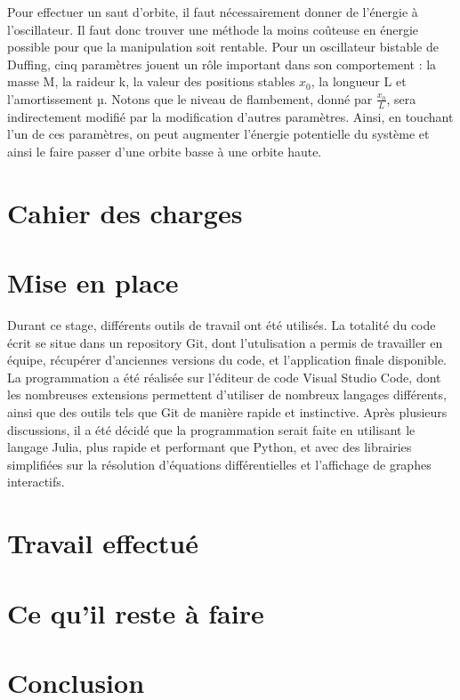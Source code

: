 \documentclass[a4paper, french, 12pt, titlepage]{report}
\begin{document}
Pour effectuer un saut d'orbite, il faut nécessairement donner de l'énergie à l'oscillateur. Il faut donc trouver une méthode la moins coûteuse en énergie possible pour que la manipulation soit rentable. Pour un oscillateur bistable de Duffing, cinq paramètres jouent un rôle important dans son comportement : la masse M, la raideur k, la valeur des positions stables $x_0$, la longueur L et l'amortissement µ. Notons que le niveau de flambement, donné par $\frac{x_0}{L}$, sera indirectement modifié par la modification d'autres paramètres. Ainsi, en touchant l'un de ces paramètres, on peut augmenter l'énergie potentielle du système et ainsi le faire passer d'une orbite basse à une orbite haute. 


\section{Cahier des charges}

\section{Mise en place}

Durant ce stage, différents outils de travail ont été utilisés. La totalité du code écrit se situe dans un repository Git, dont l'utulisation a permis de travailler en équipe, récupérer d'anciennes versions du code, et l'application finale disponible. La programmation a été réalisée sur l'éditeur de code Visual Studio Code, dont les nombreuses extensions permettent d'utiliser de nombreux langages différents, ainsi que des outils tels que Git de manière rapide et instinctive. Après plusieurs discussions, il a été décidé que la programmation serait faite en utilisant le langage Julia, plus rapide et performant que Python, et avec des librairies simplifiées sur la résolution d'équations différentielles et l'affichage de graphes interactifs. 

\section{Travail effectué}

\section{Ce qu'il reste à faire}

\section{Conclusion}
\end{document}
